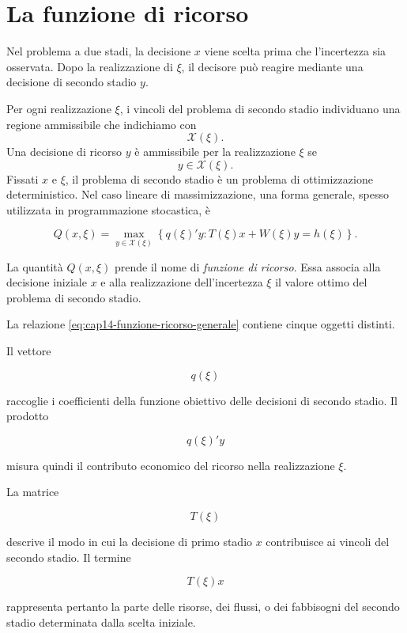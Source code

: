 \section{La funzione di ricorso}

\label{sec:cap14-ricorso}

Nel problema a due stadi, la decisione $x$ viene scelta prima che
l'incertezza sia osservata. Dopo la realizzazione di $\xi$, il decisore
pu\`o reagire mediante una decisione di secondo stadio $y$.

Per ogni realizzazione $\xi$, i vincoli del problema di secondo stadio individuano una regione ammissibile che indichiamo con
\[
\mathcal X(\xi).
\]
Una decisione di ricorso $y$ \`e ammissibile per la realizzazione $\xi$
se
\[
y\in\mathcal X(\xi).
\]
Fissati $x$ e $\xi$, il problema di secondo stadio \`e un problema di
ottimizzazione deterministico. Nel caso lineare di massimizzazione, una
forma generale, spesso utilizzata in programmazione stocastica, \`e

\begin{equation}
Q(x,\xi)
=
\max_{y\in \mathcal X(\xi)}
\left\{
q(\xi)'y:
T(\xi)x+W(\xi)y=h(\xi)
\right\}.
\label{eq:cap14-funzione-ricorso-generale}
\end{equation}

La quantit\`a $Q(x,\xi)$ prende il nome di \emph{funzione di ricorso}.
Essa associa alla decisione iniziale $x$ e alla realizzazione
dell'incertezza $\xi$ il valore ottimo del problema di secondo stadio.

La relazione
\eqref{eq:cap14-funzione-ricorso-generale} contiene cinque oggetti
distinti.

Il vettore

\[
q(\xi)
\]

\noindent raccoglie i coefficienti della funzione obiettivo delle decisioni di
secondo stadio. Il prodotto

\[
q(\xi)'y
\]

\noindent misura quindi il contributo economico del ricorso nella realizzazione
$\xi$.

La matrice

\[
T(\xi)
\]

\noindent descrive il modo in cui la decisione di primo stadio $x$ contribuisce ai
vincoli del secondo stadio. Il termine

\[
T(\xi)x
\]

\noindent rappresenta pertanto la parte delle risorse, dei flussi, o dei fabbisogni
del secondo stadio determinata dalla scelta iniziale.

